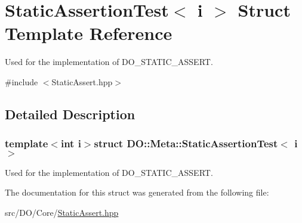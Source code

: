 \hypertarget{struct_d_o_1_1_meta_1_1_static_assertion_test}{\section{Static\-Assertion\-Test$<$ i $>$ Struct Template Reference}
\label{struct_d_o_1_1_meta_1_1_static_assertion_test}
}


Used for the implementation of D\-O\-\_\-\-S\-T\-A\-T\-I\-C\-\_\-\-A\-S\-S\-E\-R\-T.  




{\ttfamily \#include $<$Static\-Assert.\-hpp$>$}



\subsection{Detailed Description}
\subsubsection*{template$<$int i$>$struct D\-O\-::\-Meta\-::\-Static\-Assertion\-Test$<$ i $>$}

Used for the implementation of D\-O\-\_\-\-S\-T\-A\-T\-I\-C\-\_\-\-A\-S\-S\-E\-R\-T. 

The documentation for this struct was generated from the following file\-:\begin{DoxyCompactItemize}
\item 
src/\-D\-O/\-Core/\hyperlink{_static_assert_8hpp}{Static\-Assert.\-hpp}\end{DoxyCompactItemize}
